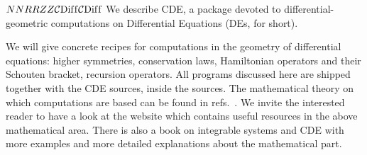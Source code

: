 


\newcommand{\cprime}{\/{\mathsurround=0pt$'$}}

\newcommand*{\pd}[2]{\mathchoice{\frac{\partial#1}{\partial#2}}
  {\partial#1/\partial#2}{\partial#1/\partial#2}
  {\partial#1/\partial#2}}
\newcommand*{\od}[2]{\mathchoice{\frac{d#1}{d#2}}
  {d#1/d#2}{d#1/d#2}{d#1/d#2}}
\newcommand*{\fd}[2]{\mathchoice{\frac{\delta#1}{\delta#2}}
  {\delta #1/\delta#2}{\delta#1/\delta#2}{\delta#1/\delta#2}}

\newcommand{\N}{\mathbb{N}}
\newcommand{\R}{\mathbb{R}}
\newcommand{\Z}{\mathbb{Z}}

\newcommand{\CDiff}{\mathop{\mathcal{C}\mathrm{Dif{}f}}}
\newcommand*{\CDiffsym}[1]{\CDiff_{(#1)}^{\,\mathrm{sym}}}
\newcommand*{\CDiffself}[1]{\CDiff_{(#1)}^{\,\mathrm{self}}}
\newcommand*{\CDiffskew}[1]{\CDiff_{(#1)}^{\,\mathrm{skew}}}

\newcommand{\ddx}[1]{D_x^{#1}}

\newcommand{\cde}{CDE\xspace}
\newcommand{\cdiff}{CDIFF\xspace}
\newcommand{\crack}{CRACK\xspace}
\newcommand{\cdiffop}{$\mathcal{C}$-differential operator\xspace}
\newcommand{\cdiffops}{$\mathcal{C}$-differential operators\xspace}

\providecommand*{\eprint}[2][]{\href{http://arXiv.org/abs/#2}%
{\begingroup \Url{arXiv:#2}}}

\ifdefined\HCode
\(
\def\pd#1#2{\mathchoice{\frac{\partial#1}{\partial#2}}
  {\partial#1/\partial#2}{\partial#1/\partial#2}
  {\partial#1/\partial#2}}
\def\od#1#2{\mathchoice{\frac{d#1}{d#2}}
  {d#1/d#2}{d#1/d#2}{d#1/d#2}}
\def\fd#1#2{\mathchoice{\frac{\delta#1}{\delta#2}}
  {\delta #1/\delta#2}{\delta#1/\delta#2}{\delta#1/\delta#2}}
\def\N{\mathbb{N}}
\def\R{\mathbb{R}}
\def\Z{\mathbb{Z}}
\def\CDiff{\mathop{\mathcal{C}\mathrm{Dif{}f}}}
\def\CDiffsym#1{\CDiff_{(#1)}^{\,\mathrm{sym}}}
\def\CDiffself#1{\CDiff_{(#1)}^{\,\mathrm{self}}}
\def\CDiffskew#1{\CDiff_{(#1)}^{\,\mathrm{skew}}}
\def\ddx#1{D_x^{#1}}
\)%
\fi
We describe \cde, a \REDUCE package devoted to differential-geometric
computations on Differential Equations (DEs, for short).

We will give concrete recipes for computations in the geometry of
differential equations: higher symmetries, conservation laws, Hamiltonian
operators and their Schouten bracket, recursion operators. All programs
discussed here are shipped together with the \cde sources, inside the \REDUCE
sources. The mathematical theory on which
computations are based can be found in refs.~\cite{Krasilshchik:99,KerstenKrasilshchikVerboretsky:2004}. We invite the
interested reader to have a look at the website \cite{gdeq} which contains
useful resources in the above mathematical area. There is also a book on integrable systems
and \cde \cite{KrasilshchikVerbovetskyVitolo:2018} with more examples and
more detailed explanations about the mathematical part.

